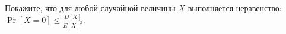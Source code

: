 Покажите, что для любой случайной величины $X$ выполняется неравенство: $\Pr[X = 0] \le \frac{D[X]}{E[X]^2}$.